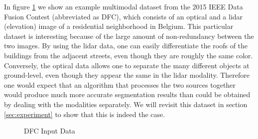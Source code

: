\documentclass[journal]{IEEEtran}
\begin{document}
In figure \ref{fig:DFCfig1} we show an example multimodal dataset from the 2015
IEEE Data Fusion Contest \cite{7536139} (abbreviated as DFC), which consists of
an optical and a lidar (elevation) image of a residential neighborhood in
Belgium. This particular dataset is interesting because of the large amount of
non-redundancy between the two images. By using the lidar data, one can easily
differentiate the roofs of the buildings from the adjacent streets, even though
they are roughly the same color. Conversely, the optical data allows one to
separate the many different objects at ground-level, even though they appear the
same in the lidar modality. Therefore one would expect that an algorithm that
processes the two sources together would produce much more accurate segmentation
results than could be obtained by dealing with the modalities separately.  We
will revisit this dataset in section \ref{sec:experiment} to show that this is
indeed the case.

\begin{figure}[!t]
  \centering {}%
  \hfil %
  \caption{DFC Input Data}
  \label{fig:DFCfig1}
\end{figure}
\end{document}
